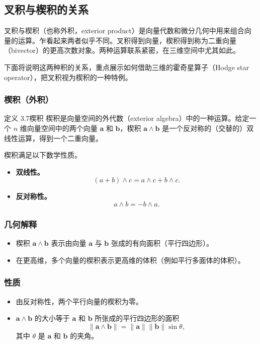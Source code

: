 \subsection{叉积与楔积的关系}
叉积与楔积（也称外积，exterior product）是向量代数和微分几何中用来组合向量的运算。乍看起来两者似乎不同。叉积得到向量，楔积得到称为二重向量（bivector）的更高次数对象。两种运算联系紧密，在三维空间中尤其如此。

下面将说明这两种积的关系，重点展示如何借助三维的霍奇星算子（Hodge star operator），把叉积视为楔积的一种特例。

\subsubsection{楔积（外积）}
\begin{statement}{定义 3.7}{楔积}
楔积是向量空间的外代数（exterior algebra）中的一种运算。给定一个 $n$ 维向量空间中的两个向量 $\symbf{a}$ 和 $\symbf{b}$，楔积 $\symbf{a}\wedge\symbf{b}$ 是一个反对称的（交替的）双线性运算，得到一个二重向量。

楔积满足以下数学性质。
\begin{itemize}
\item \textbf{双线性。}
\[
 (a+b)\wedge c=a\wedge c+b\wedge c.
\]
\item \textbf{反对称性。}
\[
  a\wedge b=-b\wedge a.
\]
\end{itemize}
\end{statement}

\subsubsection{几何解释}
\begin{itemize}
\item 楔积 $\symbf{a}\wedge\symbf{b}$ 表示由向量 $\symbf{a}$ 与 $\symbf{b}$ 张成的有向面积（平行四边形）。
\item 在更高维，多个向量的楔积表示更高维的体积（例如平行多面体的体积）。
\end{itemize}

\subsubsection{性质}
\begin{itemize}
\item 由反对称性，两个平行向量的楔积为零。
\item $\symbf{a}\wedge\symbf{b}$ 的大小等于 $\symbf{a}$ 和 $\symbf{b}$ 所张成的平行四边形的面积
\[
  \lVert\symbf{a}\wedge\symbf{b}\rVert
  =\lVert\symbf{a}\rVert\lVert\symbf{b}\rVert\sin\theta,
\]
其中 $\theta$ 是 $\symbf{a}$ 和 $\symbf{b}$ 的夹角。
\end{itemize}

